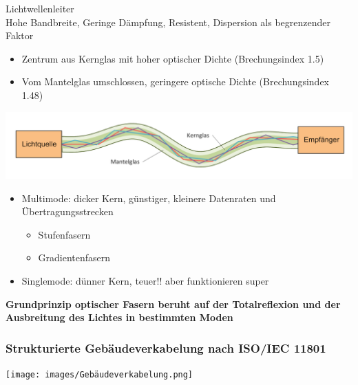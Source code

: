     \begin{concept}{Lichtwellenleiter}\\
        Hohe Bandbreite, Geringe Dämpfung, Resistent, Dispersion als begrenzender Faktor
        \begin{itemize}
            \item Zentrum aus Kernglas mit hoher optischer Dichte (Brechungsindex 1.5)
            \item Vom Mantelglas umschlossen, geringere optische Dichte (Brechungsindex 1.48)
        \end{itemize}
            \begin{center}
                \includegraphics[width=1\linewidth]{images/Lichtwellenleiter.png}\\
            \end{center}
        \begin{itemize}
            \item Multimode: dicker Kern, günstiger, kleinere Datenraten und Übertragungsstrecken
            \begin{itemize}
                \item Stufenfasern
                \item Gradientenfasern
            \end{itemize}
            \item Singlemode: dünner Kern, teuer!! aber funktionieren super
        \end{itemize}
        \vspace{2mm}
        \textbf{Grundprinzip optischer Fasern beruht auf der Totalreflexion und der Ausbreitung des Lichtes in bestimmten Moden}
    \end{concept}
  

    \subsubsection{Strukturierte Gebäudeverkabelung nach ISO/IEC 11801}
        \centering
        \texttt{[image: images/Gebäudeverkabelung.png]}
        
    